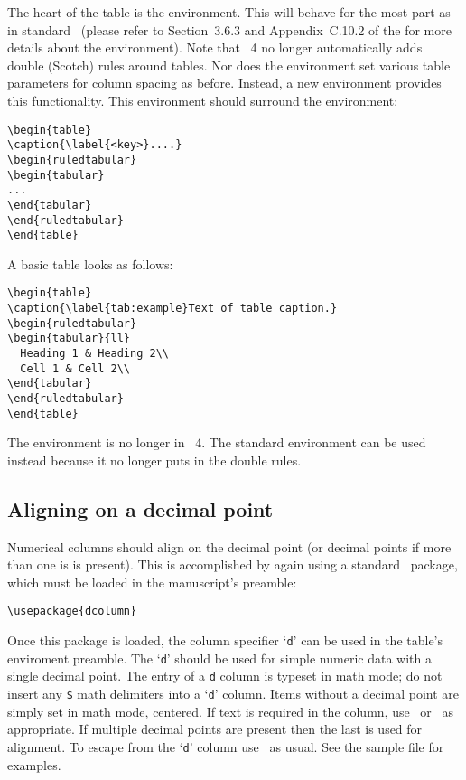 \documentclass[%
 ,twocolumn%
 ,secnumarabic%
,amssymb, amsmath,nobibnotes, aps, prl]{revtex4}
\begin{document}
The heart of the table is the
 environment. This will behave for the most part as in
standard \LaTeXe\ (please refer to Section~3.6.3 and Appendix~C.10.2 of the
\LUG{} for more details about the  environment).
Note that \revtex~4 no longer automatically adds double (Scotch) rules
around tables. Nor does the  environment set various
table parameters for column spacing as before. Instead, a new
environment  provides this functionality. This
environment should surround the  environment:
\begin{verbatim}
\begin{table}
\caption{\label{<key>}....}
\begin{ruledtabular}
\begin{tabular}
...
\end{tabular}
\end{ruledtabular}
\end{table}
\end{verbatim}

A basic table looks as follows:
\begin{verbatim}
\begin{table}
\caption{\label{tab:example}Text of table caption.}
\begin{ruledtabular}
\begin{tabular}{ll}
  Heading 1 & Heading 2\\
  Cell 1 & Cell 2\\
\end{tabular}
\end{ruledtabular}
\end{table}
\end{verbatim}

The  environment is no longer in \revtex~4. The
standard  environment can be used instead because it
no longer puts in the double rules.

\subsection{Aligning on a decimal point}
Numerical columns should align on the decimal point (or
decimal points if more than one is is present). This is accomplished
by again using a standard \LaTeXe\ package,  which
must be loaded in the manuscript's preamble:
\begin{verbatim}
\usepackage{dcolumn}
\end{verbatim}
Once this package is loaded, the column specifier `\texttt{d}' can be
used in the table's  enviroment preamble.
The `\texttt{d}' should be used for simple numeric data with a single
decimal point.
%
The entry of a \texttt{d} column is typeset in math mode; do not
insert any \verb+$+ math delimiters into a `\texttt{d}' column.  Items
without a decimal point are simply set in math mode, centered.  If
text is required in the column, use \cmd\text\ or \cmd\mbox\ as
appropriate.  If multiple decimal points are present then the last is
used for alignment. To escape from the `\texttt{d}' column use
\cmd\multicolumn\ as usual. See the sample file  for examples.
\end{document}
